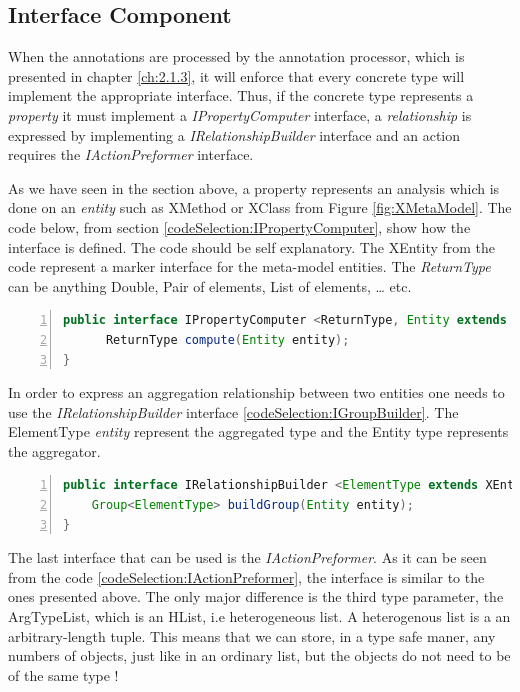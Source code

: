 \subsection{Interface Component}\label{ch:2.1.2}
        
        When the annotations are processed by the annotation processor, which is presented in chapter \ref{ch:2.1.3}, it will enforce that every concrete type will implement the appropriate
interface. Thus, if the concrete type represents a \textit{property} it must implement a \textit{IPropertyComputer} interface, a \textit{relationship} is expressed by implementing a 
\textit{IRelationshipBuilder} interface and an action requires the \textit{IActionPreformer} interface.

        As we have seen in the section above, a property represents an analysis which is done on an \textit{entity} such as XMethod or XClass from Figure \ref{fig:XMetaModel}. The code below, 
from section \ref{codeSelection:IPropertyComputer}, show how the interface is defined. The code should be self explanatory. The XEntity from the code represent a marker interface for the meta-model entities.
The \textit{ReturnType} can be anything Double, Pair of elements, List of elements, \ldots{} etc.
        
\small
\begin{lstlisting}[language=Java,numbers=left]
 public interface IPropertyComputer <ReturnType, Entity extends XEntity> {
      ReturnType compute(Entity entity);
}   
\end{lstlisting}
\normalsize{} \label{codeSelection:IPropertyComputer}

        In order to express an aggregation relationship between two entities one needs to use the \textit{IRelationshipBuilder} interface \ref{codeSelection:IGroupBuilder}. 
The ElementType \textit{entity} represent the aggregated type and the Entity type represents the aggregator.

\small
\begin{lstlisting}[language=Java,numbers=left]
public interface IRelationshipBuilder <ElementType extends XEntity, Entity extends XEntity> {
    Group<ElementType> buildGroup(Entity entity);
}
\end{lstlisting}
\normalsize{} \label{codeSelection:IGroupBuilder}

        The last interface that can be used is the \textit{IActionPreformer}. As it can be seen from the code \ref{codeSelection:IActionPreformer}, the interface is similar
to the ones presented above. The only major difference is the third type parameter, the ArgTypeList, which is an HList, i.e heterogeneous list. A heterogenous list is a an
arbitrary-length tuple. This means that we can store, in a type safe maner, any numbers of objects, just like in an ordinary list, but the objects do not need to be of the 
same type !

